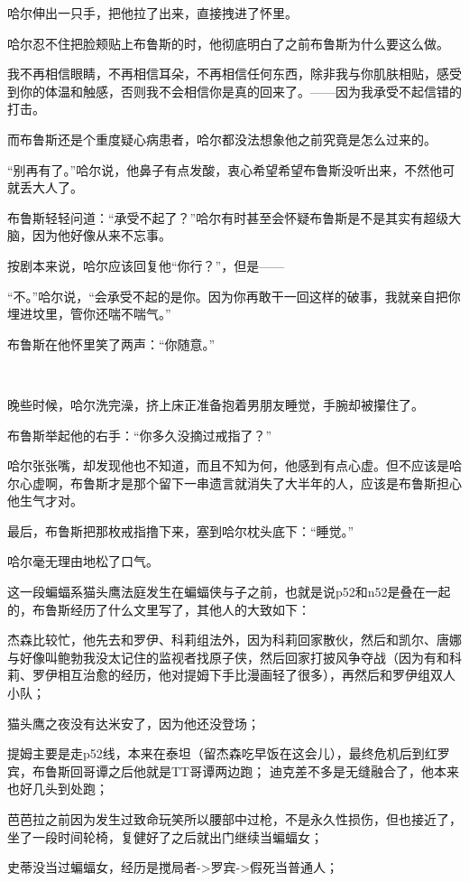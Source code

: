 \documentclass[../main]{subfiles}
\begin{document}
哈尔伸出一只手，把他拉了出来，直接拽进了怀里。

哈尔忍不住把脸颊贴上布鲁斯的时，他彻底明白了之前布鲁斯为什么要这么做。

我不再相信眼睛，不再相信耳朵，不再相信任何东西，除非我与你肌肤相贴，感受到你的体温和触感，否则我不会相信你是真的回来了。——因为我承受不起信错的打击。

而布鲁斯还是个重度疑心病患者，哈尔都没法想象他之前究竟是怎么过来的。

“别再有了。”哈尔说，他鼻子有点发酸，衷心希望希望布鲁斯没听出来，不然他可就丢大人了。

布鲁斯轻轻问道：“承受不起了？”哈尔有时甚至会怀疑布鲁斯是不是其实有超级大脑，因为他好像从来不忘事。

按剧本来说，哈尔应该回复他“你行？”，但是——

“不。”哈尔说，“会承受不起的是你。因为你再敢干一回这样的破事，我就亲自把你埋进坟里，管你还喘不喘气。”

布鲁斯在他怀里笑了两声：“你随意。”

~\

晚些时候，哈尔洗完澡，挤上床正准备抱着男朋友睡觉，手腕却被攥住了。

布鲁斯举起他的右手：“你多久没摘过戒指了？”

哈尔张张嘴，却发现他也不知道，而且不知为何，他感到有点心虚。但不应该是哈尔心虚啊，布鲁斯才是那个留下一串遗言就消失了大半年的人，应该是布鲁斯担心他生气才对。

最后，布鲁斯把那枚戒指撸下来，塞到哈尔枕头底下：“睡觉。”

哈尔毫无理由地松了口气。

\horline

这一段蝙蝠系猫头鹰法庭发生在蝙蝠侠与子之前，也就是说p52和n52是叠在一起的，布鲁斯经历了什么文里写了，其他人的大致如下：

杰森比较忙，他先去和罗伊、科莉组法外，因为科莉回家散伙，然后和凯尔、唐娜与好像叫鲍勃我没太记住的监视者找原子侠，然后回家打披风争夺战（因为有和科莉、罗伊相互治愈的经历，他对提姆下手比漫画轻了很多），再然后和罗伊组双人小队；

猫头鹰之夜没有达米安了，因为他还没登场；

提姆主要是走p52线，本来在泰坦（留杰森吃早饭在这会儿），最终危机后到红罗宾，布鲁斯回哥谭之后他就是TT哥谭两边跑；
迪克差不多是无缝融合了，他本来也好几头到处跑；

芭芭拉之前因为发生过致命玩笑所以腰部中过枪，不是永久性损伤，但也接近了，坐了一段时间轮椅，复健好了之后就出门继续当蝙蝠女；

史蒂没当过蝙蝠女，经历是搅局者->罗宾->假死当普通人；
\end{document}
